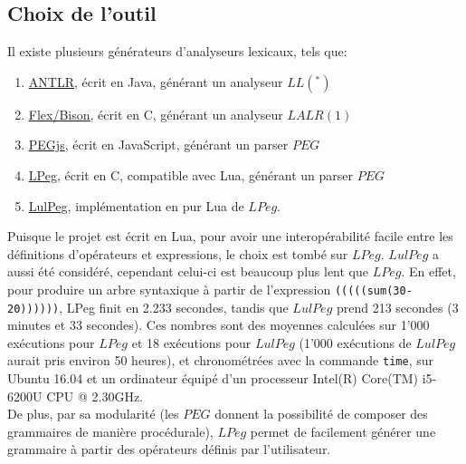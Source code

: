 \documentclass{article}
\begin{document}
\subsection{Choix de l'outil}
Il existe plusieurs générateurs d'analyseurs lexicaux, tels que: 
\begin{enumerate}
	\item \underline{\href{http://www.antlr.org/about.html}{ANTLR}}, écrit en Java, générant un analyseur $LL(^*)$
	\item \underline{\href{http://dinosaur.compilertools.net/}{Flex/Bison}}, écrit en C, générant un analyseur $LALR(1)$
	\item \underline{\href{https://pegjs.org/}{PEGjs}}, écrit en JavaScript, générant un parser $PEG$
	\item \underline{\href{https://github.com/LuaDist/lpeg}{LPeg}}, écrit en C, compatible avec Lua, générant un parser $PEG$
	\item \underline{\href{https://github.com/pygy/LuLPeg}{LulPeg}}, implémentation en pur Lua de $LPeg$.
\end{enumerate}
Puisque le projet est écrit en Lua, pour avoir une interopérabilité facile entre les définitions d'opérateurs et expressions, le choix est tombé sur $LPeg$. $LulPeg$ a aussi été considéré, cependant celui-ci est beaucoup plus lent que $LPeg$. En effet, pour produire un arbre syntaxique à partir de l'expression \texttt{(((((sum(30-20))))))}, LPeg finit en 2.233 secondes, tandis que $LulPeg$ prend 213 secondes (3 minutes et 33 secondes). Ces nombres sont des moyennes calculées sur 1'000 exécutions pour $LPeg$ et 18 exécutions pour $LulPeg$ (1'000 exécutions de $LulPeg$ aurait pris environ 50 heures), et chronométrées avec la commande \lstinline|time|, sur Ubuntu 16.04 et un ordinateur équipé d'un processeur Intel(R) Core(TM) i5-6200U CPU @ 2.30GHz. \\
De plus, par sa modularité (les $PEG$ donnent la possibilité de composer des grammaires de manière procédurale), $LPeg$ permet de facilement générer une grammaire à partir des opérateurs définis par l'utilisateur.
\end{document}

